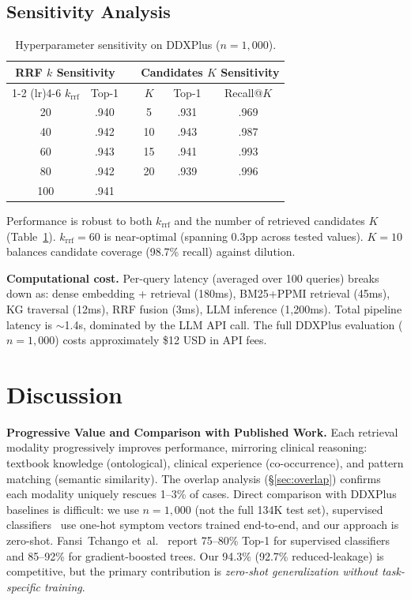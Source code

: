 \documentclass[runningheads]{llncs}
\begin{document}
\subsection{Sensitivity Analysis}
\label{sec:sensitivity}

\begin{table}[t]
\centering
\caption{Hyperparameter sensitivity on DDXPlus ($n{=}1{,}000$).}
\label{tab:sensitivity}
\begin{tabular}{cccccc}
\toprule
\multicolumn{2}{c}{\textbf{RRF $k$ Sensitivity}} & & \multicolumn{3}{c}{\textbf{Candidates $K$ Sensitivity}} \\
\cmidrule(lr){1-2} \cmidrule(lr){4-6}
$k_{\text{rrf}}$ & Top-1 & & $K$ & Top-1 & Recall@$K$ \\
\midrule
20  & .940 & & 5  & .931 & .969 \\
40  & .942 & & 10 & .943 & .987 \\
60  & .943 & & 15 & .941 & .993 \\
80  & .942 & & 20 & .939 & .996 \\
100 & .941 & & & & \\
\bottomrule
\end{tabular}
\end{table}

Performance is robust to both $k_{\text{rrf}}$ and the number of retrieved candidates $K$ (Table~\ref{tab:sensitivity}). $k_{\text{rrf}}{=}60$ is near-optimal (spanning 0.3pp across tested values). $K{=}10$ balances candidate coverage (98.7\% recall) against dilution.

\textbf{Computational cost.} Per-query latency (averaged over 100 queries) breaks down as: dense embedding + retrieval (180ms), BM25+PPMI retrieval (45ms), KG traversal (12ms), RRF fusion (3ms), LLM inference (1,200ms). Total pipeline latency is ${\sim}$1.4s, dominated by the LLM API call. The full DDXPlus evaluation ($n{=}1{,}000$) costs approximately \$12 USD in API fees.

\section{Discussion}
\label{sec:discussion}

\textbf{Progressive Value and Comparison with Published Work.}
Each retrieval modality progressively improves performance, mirroring clinical reasoning: textbook knowledge (ontological), clinical experience (co-occurrence), and pattern matching (semantic similarity). The overlap analysis (\S\ref{sec:overlap}) confirms each modality uniquely rescues 1--3\% of cases.
Direct comparison with DDXPlus baselines is difficult: we use $n{=}1{,}000$ (not the full 134K test set), supervised classifiers~\cite{fansi2022ddxplus} use one-hot symptom vectors trained end-to-end, and our approach is zero-shot. Fansi~Tchango et~al.~\cite{fansi2022ddxplus} report 75--80\% Top-1 for supervised classifiers and 85--92\% for gradient-boosted trees. Our 94.3\% (92.7\% reduced-leakage) is competitive, but the primary contribution is \emph{zero-shot generalization without task-specific training}.
\end{document}
